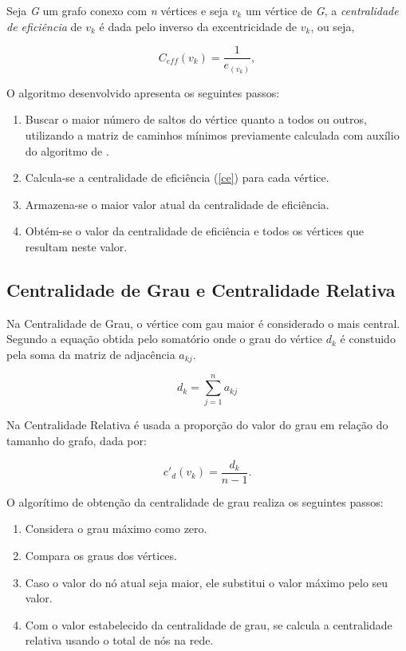 \documentclass[12pt]{article}
\begin{document}
Seja  {\it G} um grafo conexo com {\it n} vértices  e seja $v_k$ um vértice de {\it G}, a {\it centralidade de eficiência} de $v_k$ é dada pelo inverso da excentricidade de $v_k$, ou seja,
\begin{center}
\begin{equation}
C_{eff}(v_k)= \frac{1}{e_{(v_k)}},\label{ce}
\end{equation}
\end{center}
O algoritmo desenvolvido apresenta os seguintes passos:
\begin{enumerate}
\item Buscar o maior número de saltos do vértice quanto a todos ou outros, utilizando a matriz de caminhos mínimos previamente calculada com auxílio do algoritmo de \cite{Brandes01afaster}.
\item Calcula-se a centralidade de eficiência (\ref{ce}) para cada vértice. 
\item Armazena-se o maior valor atual da centralidade de eficiência.
\item Obtém-se o valor da centralidade de eficiência e todos os vértices que resultam neste valor. 
\end{enumerate} 
   
   
   
   
\subsection{Centralidade de Grau e Centralidade Relativa}
Na Centralidade de Grau, o vértice com gau maior é considerado o  mais central.
Segundo \cite{freitas} a equação obtida pelo somatório onde o grau do vértice $d_{k}$ é constuido pela soma da matriz de adjacência $a_{kj}$.
\begin{center}
\begin{equation}
d_{k}= \sum_{j=1}^{n}a_{kj}
\end{equation}
\end{center}

Na Centralidade Relativa é usada a proporção do valor do grau em relação do tamanho do grafo, dada por:
\begin{center}
\begin{equation}
{c}'_{d}(v_{k})=\frac{d_k}{n-1}.
\end{equation}
\end{center}

O algorítimo de obtenção da centralidade de grau realiza os seguintes passos:
\begin{enumerate}
\item Considera o grau máximo como zero.
\item Compara os graus dos vértices.
\item Caso o valor do nó atual seja maior, ele substitui o valor máximo pelo seu valor.
\item Com o valor estabelecido da centralidade de grau, se calcula a centralidade relativa usando o total de nós na rede.
\end{enumerate}
\end{document}
